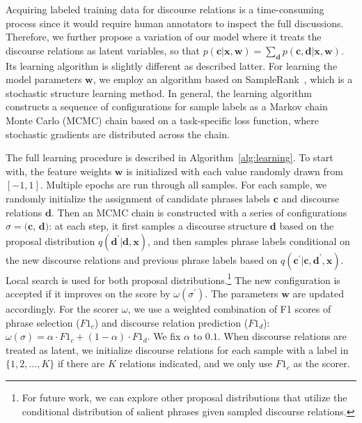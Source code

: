 Acquiring labeled training data for discourse relations is a time-consuming process since it would require human annotators to inspect the full discussions. Therefore, we further propose a variation of our model where it treats the discourse relations as latent variables, so that $p(\mathbf{c} |\mathbf{x}, \mathbf{w})=\sum_{\mathbf{d}} p(\mathbf{c}, \mathbf{d}|\mathbf{x}, \mathbf{w})$. Its learning algorithm is slightly different as described latter. For learning the model parameters $\mathbf{w}$, we employ an algorithm based on SampleRank~\cite{rohanimanesh2011samplerank}, which is a stochastic structure learning method. In general, the learning algorithm constructs a sequence of configurations for sample labels as a Markov chain Monte Carlo (MCMC) chain based on a task-specific loss function, where stochastic gradients are distributed across the chain. %

The full learning procedure is described in Algorithm~\ref{alg:learning}. To start with, the feature weights $\mathbf{w}$ is initialized with each value randomly drawn from $[-1, 1]$. Multiple epochs are run through all samples. 
For each sample, we randomly initialize the assignment of candidate phrases labels $\mathbf{c}$ and discourse relations $\mathbf{d}$. 
%
Then an MCMC chain is constructed with a series of configurations $\sigma =(\mathbf{c}$, $\mathbf{d})$: at each step, it first samples a discourse structure $\mathbf{d}$ based on the proposal distribution $q(\mathbf{d^\prime} |\mathbf{d},\mathbf{x})$, and then samples phrase labels conditional on the new discourse relations and previous phrase labels based on $q(\mathbf{c^\prime} |\mathbf{c}, \mathbf{d^\prime},\mathbf{x})$. Local search is used for both proposal distributions.\footnote{For future work, we can explore other proposal distributions that utilize the conditional distribution of salient phrases given sampled discourse relations.}   
%
The new configuration is accepted if it improves on the score by $\omega (\sigma ^\prime)$. The parameters $\mathbf{w}$ are updated accordingly. For the scorer $\omega$, we use a weighted combination of F1 scores of phrase selection ($F1_{c}$) and discourse relation prediction ($F1_{d}$): $\omega (\sigma)= \alpha \cdot F1_{c} +  (1-\alpha) \cdot F1_{d}$. We fix $\alpha$ to $0.1$. When discourse relations are treated as latent, we initialize discourse relations for each sample with a label in $\{1, 2, \ldots, K\}$ if there are $K$ relations indicated, and we only use $F1_{c}$ as the scorer.


